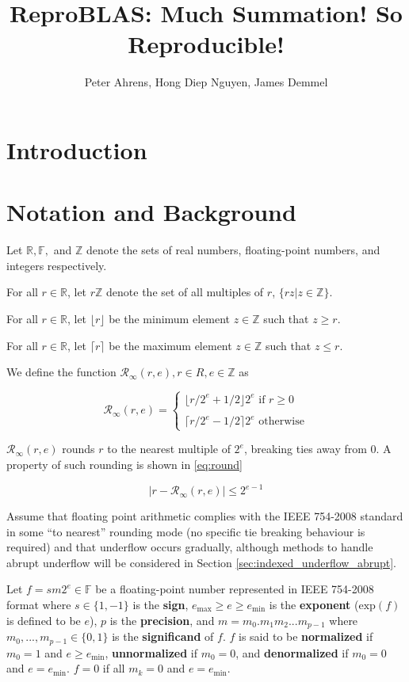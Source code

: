\documentclass[12pt]{article}
\author{Peter Ahrens, Hong Diep Nguyen, James Demmel}
\title{ReproBLAS: Much Summation! So Reproducible!}
\providecommand{\R}{\ensuremath{\mathbb{R}}}
\providecommand{\F}{\ensuremath{\mathbb{F}}}
\providecommand{\Z}{\ensuremath{\mathbb{Z}}}
\providecommand{\exp}{\ensuremath{\text{exp}}}
\providecommand{\min}{\ensuremath{\text{min}}}
\providecommand{\max}{\ensuremath{\text{max}}}
\providecommand{\roundtonearestinfty}{\ensuremath{\mathcal{R}_\text{$\infty$}}}
\theoremstyle{definition}
\numberwithin{equation}{section}
\numberwithin{figure}{section}
\begin{document}
\noindent
\maketitle
\tableofcontents
\newpage
\section{Introduction}
\section{Notation and Background}
  Let $\R, \F, $ and $\Z$ denote the sets of real numbers, floating-point numbers, and integers respectively.

  For all $r \in \R$, let $r\Z$ denote the set of all multiples of $r$, $\{rz | z \in \Z\}$.

  For all $r \in \R$, let $\lfloor r \rfloor$ be the minimum element $z \in \Z$ such that $z \geq r$.

  For all $r \in \R$, let $\lceil r \rceil$ be the maximum element $z \in \Z$ such that $z \leq r$.

  We define the function $\roundtonearestinfty(r, e), r \in R, e \in \Z$ as

  \begin{equation}
    \roundtonearestinfty(r, e) = \begin{cases}\lfloor r/2^e + 1/2 \rfloor 2^e \text{ if } r \geq 0\\ \\ \lceil r/2^e - 1/2 \rceil 2^e \text{ otherwise}\end{cases}
  \end{equation}

  $\roundtonearestinfty(r, e)$ rounds $r$ to the nearest multiple of $2^e$, breaking ties away from 0. A property of such rounding is shown in  \eqref{eq:round}

  \begin{equation}
    \bigl|r - \roundtonearestinfty(r, e)\bigr| \leq 2^{e - 1}
    \label{eq:round}
  \end{equation}

  Assume that floating point arithmetic complies with the IEEE 754-2008 standard \cite{ieee754} in some ``to nearest'' rounding mode (no specific tie breaking behaviour is required) and that underflow occurs gradually, although methods to handle abrupt underflow will be considered in Section \ref{sec:indexed_underflow_abrupt}.

  Let $f = sm2^e \in \F$ be a floating-point number represented in IEEE 754-2008 format \cite{ieee754} where $s \in \{1, -1\}$ is the \textbf{sign}, $e_{\max} \geq e \geq e_{\min}$ is the \textbf{exponent} ($\exp(f)$ is defined to be $e$), $p$ is the \textbf{precision}, and $m = m_0.m_1m_2...m_{p-1}$ where $m_0, ..., m_{p - 1} \in \{0, 1\}$ is the \textbf{significand} of $f$. $f$ is said to be \textbf{normalized} if $m_0 = 1$ and $e \geq e_{\min}$, \textbf{unnormalized} if $m_0 = 0$, and \textbf{denormalized} if $m_0 = 0$ and $e = e_{\min}$. $f = 0$ if all $m_k = 0$ and $e = e_{\min}$.
\end{document}

